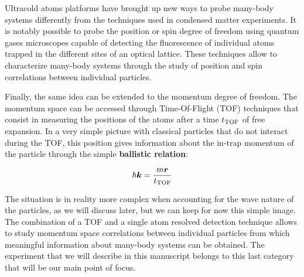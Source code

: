 Ultracold atoms platforms have brought up new ways to probe many-body systems differently from the techniques used in condensed matter experiments. It is notably possible to probe the position or spin degree of freedom using quantum gases microscopes \cite{bakr2009quantum,cheuk2015quantum,esteve2008squeezing,sherson2010single} capable of detecting the fluorescence of individual atoms trapped in the different sites of an optical lattice. These techniques allow to characterize many-body systems through the study of position and spin correlations between individual particles.

Finally, the same idea can be extended to the momentum degree of freedom. The momentum space can be accessed through Time-Of-Flight (TOF) techniques \cite{greiner2002quantum,spielman2008condensate,xu2006observation} that consist in measuring the positions of the atoms after a time $t_{\rm{TOF}}$ of free expansion. In a very simple picture with classical particles that do not interact during the TOF, this position gives information about the in-trap momentum of the particle through the simple \textbf{ballistic relation}:

\begin{equation}
    \hbar \bm{k} = \frac{m \bm{r}}{t_{\rm{TOF}}}
\end{equation} 

The situation is in reality more complex when accounting for the wave nature of the particles, as we will discuss later, but we can keep for now this simple image. The combination of a TOF and a single atom resolved detection technique allows to study momentum space correlations between individual particles from which meaningful information about many-body systems can be obtained. The experiment that we will describe in this manuscript belongs to this last category that will be our main point of focus.






